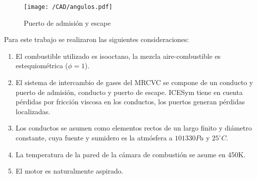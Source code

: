  
 

\begin{figure}[h] \centering
\texttt{[image: /CAD/angulos.pdf]}
    \caption{Puerto de admisión y escape}\label{fig:angulos_puertos}
\end{figure}





Para este trabajo se realizaron las siguientes consideraciones:

\begin{enumerate}
    \item El combustible utilizado es isooctano, la mezcla aire-combustible es
estequiométrica ($\phi=1$).
    \item El sistema de intercambio de gases del MRCVC se compone de un conducto
y puerto de admisión, conducto y puerto de escape.
        ICESym tiene en cuenta pérdidas por fricción viscosa en los conductos,
los puertos generan pérdidas localizadas.
    \item Los conductos se asumen como elementos rectos de un largo finito y
diámetro constante, cuya fuente y sumidero es la atmósfera a $101330 Pa$ y
$25^{\circ}C$.
    \item La temperatura de la pared de la cámara de combustión se asume en
450K.
    \item El motor es naturalmente aspirado.
\end{enumerate}
%

